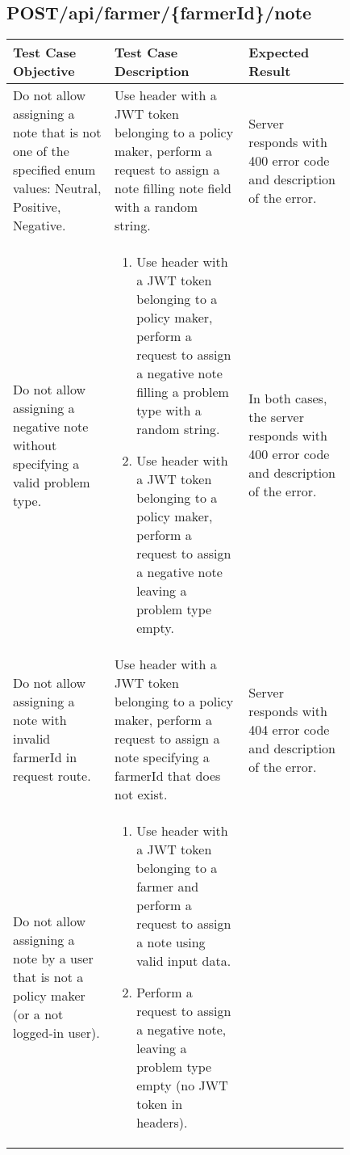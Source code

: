 \subsection{POST\slash api\slash farmer\slash \{farmerId\}\slash note}
\begin{longtable}{p{0.25\linewidth}p{0.33\linewidth}p{0.25\linewidth}}
	\toprule
	\textbf{Test Case Objective}   & \textbf{Test Case Description} & \textbf{Expected Result}\\
	\midrule
	Do not allow assigning a note that is not one of the specified enum values: Neutral, Positive, Negative. & Use header with a JWT token belonging to a policy maker, perform a request to assign a note filling note field with a random string. & Server responds with 400 error code and description of the error. \\
	\midrule
	Do not allow assigning a negative note without specifying a valid problem type. & \begin{enumerate}[leftmargin=.4cm,noitemsep,topsep=0pt,before=\vspace{-6mm},after=\vspace{-4mm}]
	    \item Use header with a JWT token belonging to a policy maker, perform a request to assign a negative note filling a problem type with a random string.
	    \item Use header with a JWT token belonging to a policy maker, perform a request to assign a negative note leaving a problem type empty.
	\end{enumerate} & In both cases, the server responds with 400 error code and description of the error.\\
	\midrule
	Do not allow assigning a note with invalid farmerId in request route. & Use header with a JWT token belonging to a policy maker, perform a request to assign a note specifying a farmerId that does not exist. & Server responds with 404 error code and description of the error.\\
	\midrule
	Do not allow assigning a note by a user that is not a policy maker (or a not logged-in user). & 
	\begin{enumerate}[leftmargin=.4cm,noitemsep,topsep=0pt,before=\vspace{-6mm},after=\vspace{-4mm}]
	    \item Use header with a JWT token belonging to a farmer and perform a request to  assign a note using valid input data.
	    \item Perform a request to assign a negative note, leaving a problem type empty (no JWT token in headers).

\end{enumerate}
\end{longtable}

